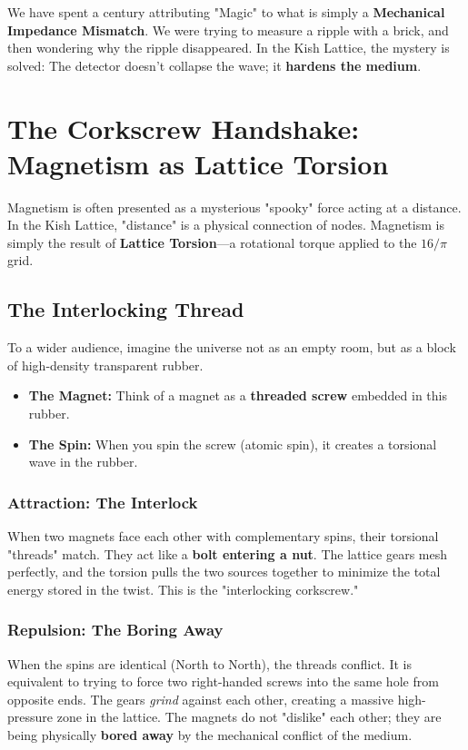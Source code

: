 \documentclass[11pt, letterpaper, openany]{book}
\begin{document}
We have spent a century attributing "Magic" to what is simply a \textbf{Mechanical Impedance Mismatch}. We were trying to measure a ripple with a brick, and then wondering why the ripple disappeared. In the Kish Lattice, the mystery is solved: The detector doesn't collapse the wave; it \textbf{hardens the medium}.


\chapter{The Corkscrew Handshake: Magnetism as Lattice Torsion}
\label{ch:magnetism}

Magnetism is often presented as a mysterious "spooky" force acting at a distance. In the Kish Lattice, "distance" is a physical connection of nodes. Magnetism is simply the result of \textbf{Lattice Torsion}—a rotational torque applied to the $16/\pi$ grid.

\section{The Interlocking Thread}
To a wider audience, imagine the universe not as an empty room, but as a block of high-density transparent rubber. 
\begin{itemize}
    \item \textbf{The Magnet:} Think of a magnet as a \textbf{threaded screw} embedded in this rubber.
    \item \textbf{The Spin:} When you spin the screw (atomic spin), it creates a torsional wave in the rubber.
\end{itemize}

\subsection{Attraction: The Interlock}
When two magnets face each other with complementary spins, their torsional "threads" match. They act like a \textbf{bolt entering a nut}. The lattice gears mesh perfectly, and the torsion pulls the two sources together to minimize the total energy stored in the twist. This is the "interlocking corkscrew."

\subsection{Repulsion: The Boring Away}
When the spins are identical (North to North), the threads conflict. It is equivalent to trying to force two right-handed screws into the same hole from opposite ends. The gears \textit{grind} against each other, creating a massive high-pressure zone in the lattice. The magnets do not "dislike" each other; they are being physically \textbf{bored away} by the mechanical conflict of the medium.
\end{document}
